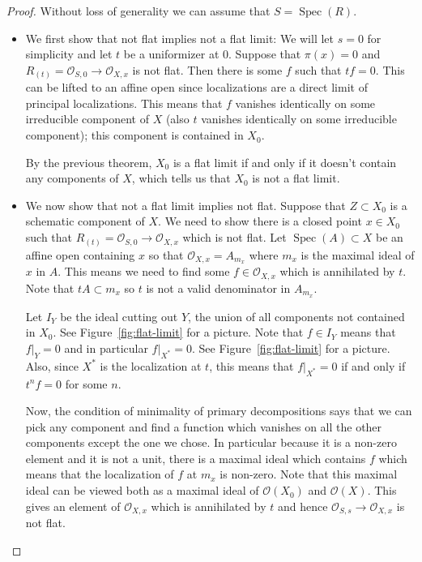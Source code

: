 \documentclass[12pt]{article}
\numberwithin{equation}{section}
\theoremstyle{definition}
\theoremstyle{remark}
\newcommand{\Ocal}{\mathcal{O}}
\newcommand{\Spec}{\operatorname{Spec}}
\begin{document}
\begin{proof}
Without loss of generality we can assume that $S = \Spec(R)$. 
\begin{itemize}
	\item We first show that not flat implies not a flat limit:
		We will let $s=0$ for simplicity and let $t$ be a uniformizer at $0$. 
	Suppose that $\pi(x)=0$ and $R_{(t)} = \Ocal_{S,0} \to \Ocal_{X,x}$ is not flat. 
	Then there is some $f$ such that $tf=0$. 
	This can be lifted to an affine open since localizations are a direct limit of principal localizations. 
	This means that $f$ vanishes identically on some irreducible component of $X$ (also $t$ vanishes identically on some irreducible component); this component is contained in $X_0$. 
	
	By the previous theorem, $X_0$ is a flat limit if and only if it doesn't contain any components of $X$, which tells us that $X_0$ is not a flat limit.  
	
	\item We now show that not a flat limit implies not flat. 
	Suppose  that $Z \subset X_0$ is a schematic component of $X$. 
	We need to show there is a closed point $x \in X_0$ such that $R_{(t)} =\Ocal_{S,0} \to \Ocal_{X,x}$ which is not flat. 
	Let $\Spec(A)\subset X$ be an affine open containing $x$ so that $\Ocal_{X,x} = A_{m_x}$ where $m_x$ is the maximal ideal of $x$ in $A$.
	This means we need to find some $f \in \Ocal_{X,x}$ which is annihilated by $t$.
	Note that $tA \subset m_x$ so $t$ is not a valid denominator in $A_{m_x}$.
	
	Let $I_Y$ be the ideal cutting out $Y$, the union of all components not contained in $X_0$. See Figure~\ref{fig:flat-limit} for a picture.
	Note that $f \in I_Y$ means that $f \vert_Y=0$ and in particular $f\vert_{X^*}=0$.
	See Figure~\ref{fig:flat-limit} for a picture. 
	Also, since $X^*$ is the localization at $t$, this means that $f\vert_{X^*}=0$ if and only if $t^nf =0$ for some $n$. 
	
	Now, the condition of minimality of primary decompositions says that we can pick any component and find a function which vanishes on all the other components except the one we chose. 
	In particular because it is a non-zero element and it is not a unit, there is a maximal ideal which contains $f$ which means that the localization of $f$ at $m_x$ is non-zero.
	Note that this maximal ideal can be viewed both as a maximal ideal of $\Ocal(X_0)$ and $\Ocal(X)$.
	This gives an element of $\Ocal_{X,x}$ which is annihilated by $t$ and hence $\Ocal_{S,s} \to \Ocal_{X,x}$ is not flat.
\end{itemize}


\end{proof}
\end{document}

